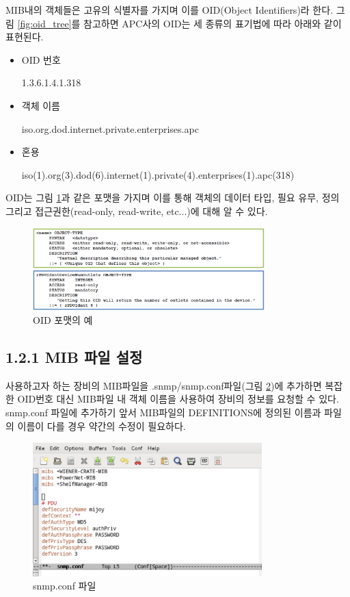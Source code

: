 \documentclass[11pt
  , a4paper
  , article
  , oneside
]{memoir}
\begin{document}
MIB내의 객체들은 고유의 식별자를 가지며 이를 OID(Object Identifiers)라 한다. 그림 \ref{fig:oid_tree}를 참고하면 APC사의 OID는 세 종류의 표기법에 따라 아래와 같이 표현된다.
\begin{itemize}
\item OID 번호 \par  1.3.6.1.4.1.318
\item 객체 이름 \par iso.org.dod.internet.private.enterprises.apc 
\item 혼용 \par iso(1).org(3).dod(6).internet(1).private(4).enterprises(1).apc(318)
\end{itemize}

OID는 그림 \ref{fig:ex_mib}과 같은 포맷을 가지며 이를 통해 객체의 데이터 타입, 필요 유무, 정의 그리고 접근권한(read-only, read-write, etc...)에 대해 알 수 있다. 

\begin{figure}[h!]
  \centering
  \includegraphics[width=0.8\textwidth]{./images/ex_mib.eps}
  \caption{OID 포맷의 예}
  \label{fig:ex_mib}   
\end{figure}


\subsection{1.2.1 MIB 파일 설정}
사용하고자 하는 장비의 MIB파일을 .snmp/snmp.conf파일(그림 \ref{fig:snmp_conf})에 추가하면 복잡한 OID번호 대신 MIB파일 내 객체 이름을 사용하여 장비의 정보를 요청할 수 있다.
snmp.conf 파일에 추가하기 앞서 MIB파일의 DEFINITIONS에 정의된 이름과 파일의 이름이 다를 경우 약간의 수정이 필요하다. 
\begin{figure}[h]
  \centering
  \includegraphics[width=0.79\textwidth]{./images/snmp_conf.eps}
  \caption{snmp.conf 파일}
  \label{fig:snmp_conf}   
\end{figure}
\end{document}

